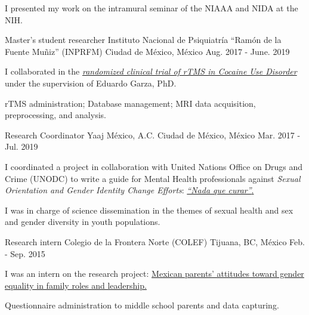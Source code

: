 \begin{cventries}
{\begin{cvitems}
                \item {I presented my work on the intramural seminar of the
                  NIAAA and NIDA at the NIH.}
            \end{cvitems}
        }
    \cventry
        {Master's student researcher}
        {Instituto Nacional de Psiquiatría ``Ramón de la Fuente Muñiz''
        (INPRFM)}
        {Ciudad de México, México}
        {Aug. 2017 - June. 2019}
        {
            \begin{cvitems}
                \item {I collaborated in the
                  \href{https://clinicaltrials.gov/ct2/show/study/NCT02986438?term=Jorge+Gonzalez-Olvera&cntry=MX&rank=2}
                {\textit{randomized clinical trial of rTMS in Cocaine Use Disorder}}
                under the supervision of Eduardo Garza, PhD.}
                \item {rTMS administration; Database
                    management; MRI data acquisition, preprocessing, and
                    analysis.}
            \end{cvitems}
        }
    \cventry
        {Research Coordinator}
        {Yaaj México, A.C.}
        {Ciudad de México, México}
        {Mar. 2017 - Jul. 2019}
        {
            \begin{cvitems}
                \item {I coordinated a project in collaboration with United
                    Nations Office on Drugs and Crime (UNODC) to write a guide
                    for Mental Health professionals against
                    \textit{Sexual Orientation and Gender Identity Change Efforts}:
                    \href{https://www.unodc.org/documents/mexicoandcentralamerica/2019/GUIAECOSIGFINAL-compressed.pdf}{\textit{``Nada que curar''}.}}
                \item {I was in charge of science dissemination in the themes
                  of sexual health and sex and gender diversity in youth
                  populations.}
            \end{cvitems}
        }
     \cventry
        {Research intern}
        {Colegio de la Frontera Norte (COLEF)}
        {Tijuana, BC, México}
        {Feb. - Sep. 2015}
        {
            \begin{cvitems}
                \item {I was an intern on the research project:
                    \href{https://estudiosdemograficosyurbanos.colmex.mx/index.php/edu/article/view/1791/pdf}{Mexican parents’ attitudes toward gender equality in family roles and leadership.}}
                  \item {Questionnaire administration to middle school parents
                    and data capturing.}
            \end{cvitems}
        }
\end{cventries}
